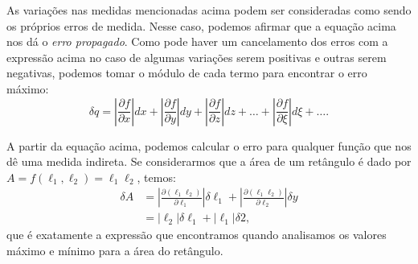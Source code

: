 As variações nas medidas mencionadas acima podem ser consideradas como sendo os próprios erros de medida. Nesse caso, podemos afirmar que a equação acima nos dá o \emph{erro propagado}. Como pode haver um cancelamento dos erros com a expressão acima no caso de algumas variações serem positivas e outras serem negativas, podemos tomar o módulo de cada termo para encontrar o erro máximo:
\begin{equation}\label{Eq:ErroGeral}
	\delta q = \left|\frac{\partial f}{\partial x}\right| dx + \left|\frac{\partial f}{\partial y}\right| dy + \left|\frac{\partial f}{\partial z}\right| dz + \dots + \left|\frac{\partial f}{\partial \xi}\right| d\xi + \dots.
\end{equation}

A partir da equação acima, podemos calcular o erro para qualquer função que nos dê uma medida indireta. Se considerarmos que a área de um retângulo é dado por $A=f(\ell_1,\ell_2)=\ell_1\ell_2$, temos:
\begin{align}
	\delta A &= \left|\frac{\partial(\ell_1\ell_2)}{\partial \ell_1}\right|\delta \ell_1 + \left|\frac{\partial (\ell_1\ell_2)}{\partial \ell_2}\right|\delta y \\
	&= |\ell_2|\delta \ell_1 + |\ell_1|\delta 2,
\end{align}
%
que é exatamente a expressão que encontramos quando analisamos os valores máximo e mínimo para a área do retângulo. 






